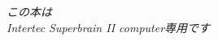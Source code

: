 ﻿\begin{titlepage}
\vspace*{\fill}

\begin{flushright}
\emph{この本は \\
Intertec Superbrain II computer専用です}

\end{flushright}

\vspace*{\fill}
\end{titlepage}

